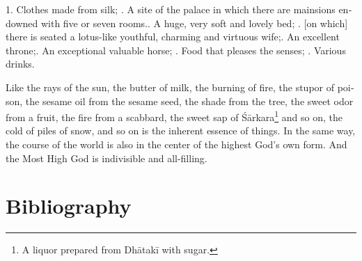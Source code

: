 \begin{otherlanguage}{english}
\begin{tlate}
\end{tlate}
\begin{tlate}
  1. Clothes made from silk; \hfill {}. A site of the palace in which there are mainsions endowned with five or seven rooms.\hfill {}. A huge, very soft and lovely bed; \hfill {}. [on which] there is seated a lotus-like youthful, charming and virtuous wife;\hfill {}. An excellent throne;\hfill {}. An exceptional valuable horse; \hfill {}. Food that pleases the senses; \hfill {}. Various drinks. \hfill \break 
\end{tlate}
\begin{tlate}
Like the rays of the sun, the butter of milk, the burning of fire, the stupor of poison, the sesame oil from the sesame seed, the shade from the tree, the sweet odor from a fruit, the fire from a scabbard, the sweet sap of Śārkara\footnote{A liquor prepared from Dhātakī with sugar.} and so on, the cold of piles of snow, and so on is the inherent essence of things. In the same way, the course of the world is also in the center of the highest God's own form. And the Most High God is indivisible and all-filling.
\end{tlate}


\end{otherlanguage}
  
 \section{Bibliography}
 \label{sec:bibli}
 

\printshorthands[keyword=critEd]

\printbibliography[title=Consulted Manuskcipts, keyword=codex]

\printbibliography[title=Printed Editions, keyword=printsource]

\printbibliography[title=Secondary Literature, keyword=seclit]
